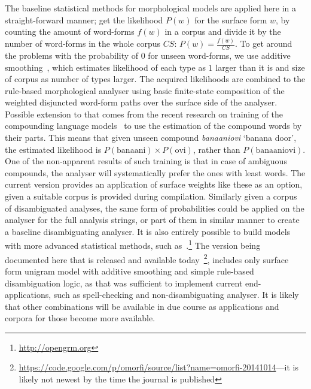 \documentclass[a4paper,12pt]{article}
\begin{document}
The baseline statistical methods for morphological models are applied here in a
straight-forward manner; get the likelihood $P(w)$ for the surface form $w$, by
counting the amount of word-forms $f(w)$ in a corpus and divide it by the
number of word-forms in the whole corpus $CS$: $P(w) = \frac{f(w)}{CS}$.  To
get around the problems with the probability of $0$ for unseen word-forms, we
use additive smoothing~\citep{chen1999empirical}, which estimates likelihood of
each type as $1$ larger than it is and size of corpus as number of types
larger. The acquired likelihoods are combined to the rule-based morphological
analyser using basic finite-state composition of the weighted disjuncted
word-form paths over the surface side of the analyser. Possible extension to
that comes from the recent research on training of the compounding language
models~\citep{pirinen2009weighting} to use the estimation of the compound words
by their parts. This means that given unseen compound \emph{banaaniovi} `banana door', the
estimated likelihood is $P(\mathrm{banaani}) \times P(\mathrm{ovi})$, rather
than $P(\mathrm{banaaniovi})$. One of the non-apparent results of such training
is that in case of ambiguous compounds, the analyser will systematically prefer
the ones with least words. The current version provides an application of
surface weights like these as an option, given a suitable corpus is provided
during compilation. Similarly given a corpus of disambiguated analyses, the
same form of probabilities could be applied on the analyser for the full
analysis strings, or part of them in similar manner to create a baseline
disambiguating analyser. It is also entirely possible to build models with more
advanced statistical methods, such
as~\citet{opengrm}.\footnote{\url{http://opengrm.org}} The version being
documented here that is released and available
today~\footnote{\url{https://code.google.com/p/omorfi/source/list?name=omorfi-20141014}---it is likely not newest by the time the journal is published},
includes only surface form unigram model with additive smoothing and simple
rule-based disambiguation logic, as that was sufficient to implement current
end-applications, such as spell-checking and non-disambiguating analyser. It is
likely that other combinations will be available in due course as applications
and corpora for those become more available.
\end{document}
